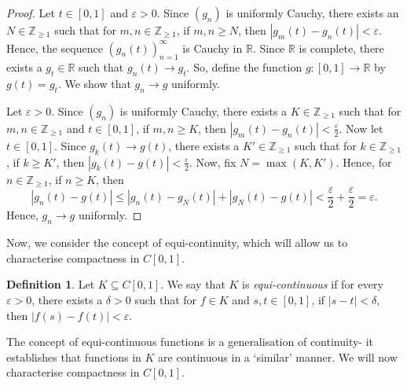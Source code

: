 \documentclass[a4paper, openany]{memoir}
\theoremstyle{definition}
\newtheorem{definition}{Definition}[section]
\theoremstyle{plain}
\begin{document}
    \begin{proof}
        Let $t \in [0, 1]$ and $\varepsilon > 0$. Since $(g_n)$ is uniformly Cauchy, there exists an $N \in \mathbb{Z}_{\geq 1}$ such that for $m, n \in \mathbb{Z}_{\geq 1}$, if $m, n \geq N$, then $|g_m(t) - g_n(t)| < \varepsilon$. Hence, the sequence $(g_n(t))_{n=1}^\infty$ is Cauchy in $\mathbb{R}$. Since $\mathbb{R}$ is complete, there exists a $g_t \in \mathbb{R}$ such that $g_n(t) \to g_t$. So, define the function $g \colon [0, 1] \to \mathbb{R}$ by $g(t) = g_t$. We show that $g_n \to g$ uniformly.

        Let $\varepsilon > 0$. Since $(g_n)$ is uniformly Cauchy, there exists a $K \in \mathbb{Z}_{\geq 1}$ such that for $m, n \in \mathbb{Z}_{\geq 1}$ and $t \in [0, 1]$, if $m, n \geq K$, then $|g_m(t) - g_n(t)| < \frac{\varepsilon}{2}$. Now let $t \in [0, 1]$. Since $g_k(t) \to g(t)$, there exists a $K' \in \mathbb{Z}_{\geq 1}$ such that for $k \in \mathbb{Z}_{\geq 1}$, if $k \geq K'$, then $|g_k(t) - g(t)| < \frac{\varepsilon}{2}$. Now, fix $N = \max(K, K')$. Hence, for $n \in \mathbb{Z}_{\geq 1}$, if $n \geq K$, then
        \[|g_n(t) - g(t)| \leq |g_n(t) - g_N(t)| + |g_N(t) - g(t)| < \frac{\varepsilon}{2} + \frac{\varepsilon}{2} = \varepsilon.\]
        Hence, $g_n \to g$ uniformly.
    \end{proof}

    Now, we consider the concept of equi-continuity, which will allow us to characterise compactness in $C[0, 1]$. 
    \begin{definition}
        Let $K \subseteq C[0, 1]$. We say that $K$ is \emph{equi-continuous} if for every $\varepsilon > 0$, there exists a $\delta > 0$ such that for $f \in K$ and $s, t \in [0, 1]$, if $|s - t| < \delta$, then $|f(s) - f(t)| < \varepsilon$.
    \end{definition}
    \noindent The concept of equi-continuous functions is a generalisation of continuity- it establishes that functions in $K$ are continuous in a `similar' manner. We will now characterise compactness in $C[0, 1]$.
\end{document}
